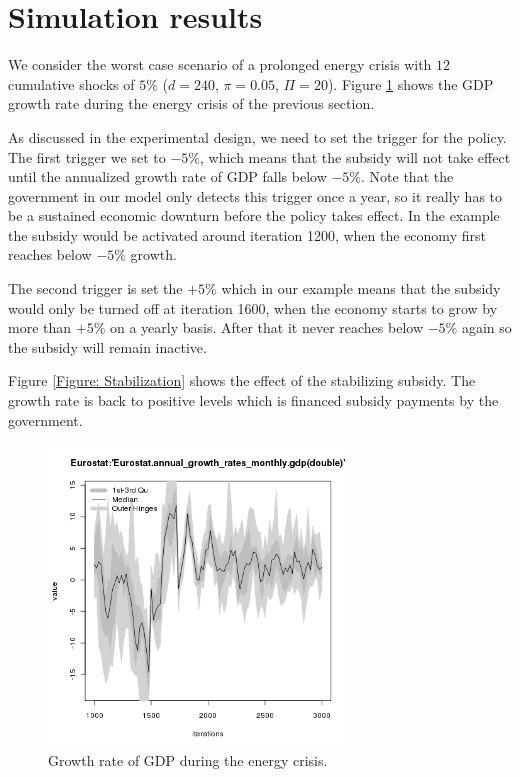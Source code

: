
\section{Simulation results}
We consider the worst case scenario of a prolonged energy crisis with $12$ cumulative shocks of $5\%$ ($d=240$, $\pi=0.05$, $\Pi=20$).
Figure \ref{Figure: energy shock 4 growth} shows the GDP growth rate during the energy crisis of the previous section. 

As discussed in the experimental design, we need to set the trigger for the policy.
The first trigger we set to $-5\%$, which means that the subsidy will not take effect until the annualized growth rate of GDP falls below $-5\%$. Note that the government in our model only detects this trigger once a year, so it really has to be a sustained economic downturn before the policy takes effect. In the example the subsidy would be activated around iteration 1200, when the economy first reaches below $-5\%$ growth.

The second trigger is set the $+5\%$ which in our example means that the subsidy would only be turned off at iteration 1600, when the economy starts to grow by more than $+5\%$ on a yearly basis. After that it never reaches below $-5\%$ again so the subsidy will remain inactive.

Figure \ref{Figure: Stabilization} shows the effect of the stabilizing subsidy. The growth rate is back to positive levels which is financed subsidy payments by the government.

\begin{figure}[ht!]
\centering\leavevmode
\begin{minipage}{17cm}
\centering\leavevmode
\includegraphics[width=8cm]{./energy_shock/png/duration_240/intensity_0.05/frequency_20/Eurostat-annual_growth_rates_monthly_gdp.png}
\end{minipage}
\caption{Growth rate of GDP during the energy crisis.}
\label{Figure: energy shock 4 growth}
\end{figure}

